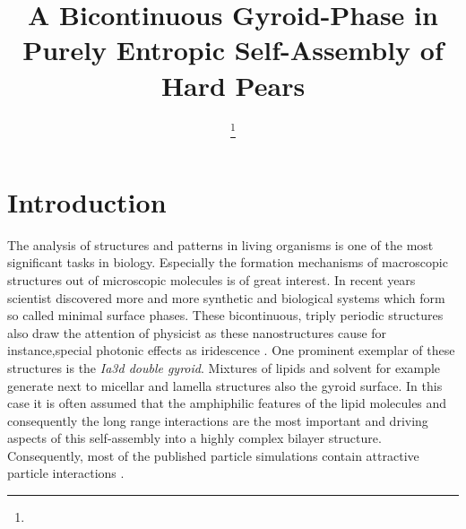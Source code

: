 \documentclass[epj,onecolumn]{webofc}
\begin{document}
%
\title{A Bicontinuous Gyroid-Phase in Purely Entropic Self-Assembly of Hard Pears}

\author{ \fnsep\thanks{} \and
         \and 
         \and
         \and
         
}


\abstract{%
}
%
\maketitle
%


\section{Introduction}
\label{sec:Intro}

The analysis of structures and patterns in living organisms is one of the most significant tasks in biology. Especially the formation mechanisms of macroscopic structures out of microscopic molecules is of great interest. In recent 
years scientist discovered more and more synthetic and biological systems which form so called minimal surface phases. These bicontinuous, triply periodic structures also draw the attention of physicist as these nanostructures 
cause for instance,special photonic effects as iridescence \cite{}. One prominent exemplar of these structures is the \textit{Ia3d double gyroid}. Mixtures of lipids and solvent for example generate next to micellar and lamella 
structures also the gyroid surface. In this case it is often assumed that the amphiphilic features of the lipid molecules and consequently the long range interactions are the most important and driving aspects of this self-assembly 
into a highly complex bilayer structure. Consequently, most of the published particle simulations contain attractive particle interactions \cite{}.\\
\end{document}
